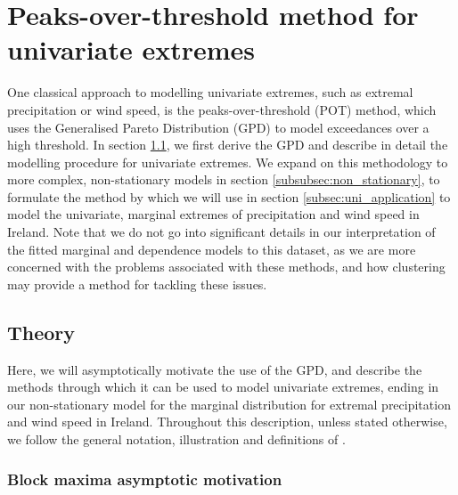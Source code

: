 \documentclass{article}
\numberwithin{equation}{section}
\begin{document}
\newpage
\section{Peaks-over-threshold method for univariate extremes}\label{sec:uni}

One classical approach to modelling univariate extremes, such as extremal precipitation or wind speed, is the peaks-over-threshold (POT) method, which uses the Generalised Pareto Distribution (GPD) to model exceedances over a high threshold.
In section \ref{subsec:uni_theory}, we first derive the GPD and describe in detail the modelling procedure for univariate extremes.
We expand on this methodology to more complex, non-stationary models in section \ref{subsubsec:non_stationary}, to formulate the method by which we will use in section \ref{subsec:uni_application} to model the univariate, marginal extremes of precipitation and wind speed in Ireland.
Note that we do not go into significant details in our interpretation of the fitted marginal and dependence models to this dataset, as we are more concerned with the problems associated with these methods, and how clustering may provide a method for tackling these issues.

\subsection{Theory} \label{subsec:uni_theory}

Here, we will asymptotically motivate the use of the GPD, and describe the methods through which it can be used to model univariate extremes, ending in our non-stationary model for the marginal distribution for extremal precipitation and wind speed in Ireland.
Throughout this description, unless stated otherwise, we follow the general notation, illustration and definitions of \citep{Coles2001}.

\subsubsection{Block maxima asymptotic motivation} \label{subsubsec:asymptotic}

\end{document}
